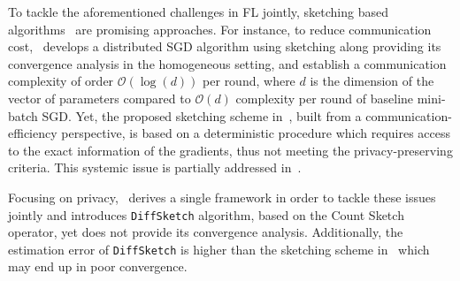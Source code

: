 \documentclass[11pt]{article}
\begin{document}
To tackle the aforementioned challenges in FL jointly, sketching based algorithms~\citep{DBLP:journals/tcs/CharikarCF04,cormode2005improved,kleinberg2003bursty,Proc:Li_Church_Hastie_NIPS08} 
are promising approaches. 
For instance, to reduce communication cost,~\citep{ivkin2019communication} develops a distributed SGD algorithm using sketching along providing its convergence analysis in the homogeneous setting, and establish a communication complexity of order $\mathcal{O}(\log(d))$ per round, where $d$ is the dimension of the vector of parameters compared to $\mathcal{O}(d)$ complexity per round of baseline mini-batch SGD. Yet, the proposed sketching scheme in~\cite{ivkin2019communication}, built from a communication-efficiency perspective, is based on a deterministic procedure which requires access to the exact information of the gradients, thus not meeting the  privacy-preserving criteria.
This systemic issue is partially addressed in~\cite{rothchild2020fetchsgd}. 


Focusing on privacy,~\citep{li2019privacy} derives a single framework in order to tackle these issues jointly and introduces \texttt{DiffSketch} algorithm, based on the Count Sketch operator, yet does not provide its convergence analysis.
Additionally, the estimation error of \texttt{DiffSketch} is higher than the sketching scheme in~\cite{ivkin2019communication} which may end up in poor convergence. 
 
\end{document}
